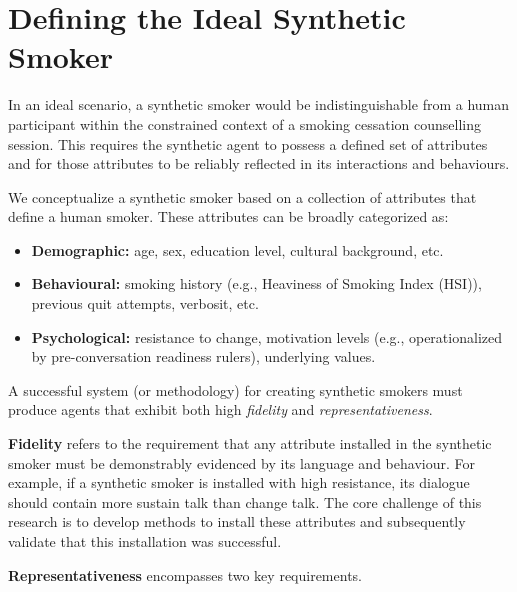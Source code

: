 \section{Defining the Ideal Synthetic Smoker}
\label{sec:synthetic-smoker-ideal}

In an ideal scenario, a synthetic smoker would be indistinguishable from a human participant within the constrained context of a smoking cessation counselling session. This requires the synthetic agent to possess a defined set of attributes and for those attributes to be reliably reflected in its interactions and behaviours.

We conceptualize a synthetic smoker based on a collection of attributes that define a human smoker. These attributes can be broadly categorized as:

\begin{itemize}
    \item \textbf{Demographic:} age, sex, education level, cultural background, etc.
    \item \textbf{Behavioural:} smoking history (e.g., Heaviness of Smoking Index (HSI)), previous quit attempts, verbosit, etc.
    \item \textbf{Psychological:} resistance to change, motivation levels (e.g., operationalized by pre-conversation readiness rulers), underlying values.
\end{itemize}

A successful system (or methodology) for creating synthetic smokers must produce agents that exhibit both high \emph{fidelity} and \emph{representativeness}.

\textbf{Fidelity} refers to the requirement that any attribute installed in the synthetic smoker must be demonstrably evidenced by its language and behaviour. For example, if a synthetic smoker is installed with high resistance, its dialogue should contain more sustain talk than change talk. The core challenge of this research is to develop methods to install these attributes and subsequently validate that this installation was successful.

\textbf{Representativeness} encompasses two key requirements.

